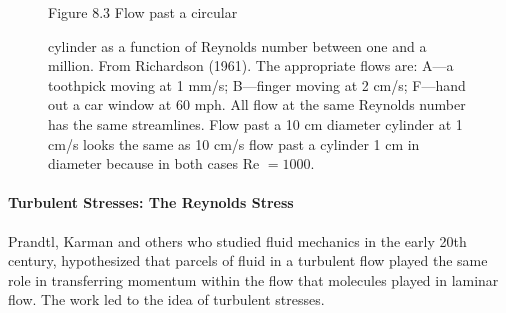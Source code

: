 \begin{figure}[t!]
\footnotesize
Figure 8.3 Flow past a circular \rule{0mm}{3ex}cylinder as a function
of Reynolds number between one and a million. From Richardson
(1961). The appropriate flows are: A---a toothpick moving at 1 mm/s;
B---finger moving at 2 cm/s; F---hand out a car window at 60 mph. All
flow at the same Reynolds number has the same streamlines. Flow past a
10 cm diameter cylinder at 1 cm/s looks the same as 10 cm/s flow past
a cylinder 1 cm in diameter because in both cases Re $= 1000$.
\label{fig:turbsketch}
\vspace{-2ex}
\end{figure}

\paragraph{Turbulent Stresses: The Reynolds Stress}
Prandtl, Karman and
others who studied fluid mechanics in the early 20th century,
hypothesized that parcels of fluid in a turbulent flow played the same
role in transferring momentum within the flow that molecules played in
laminar flow. The work led to the idea of turbulent stresses.

